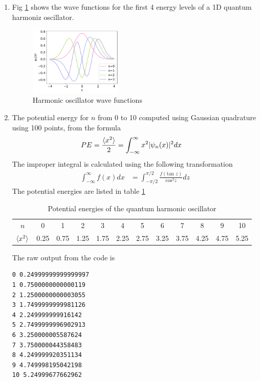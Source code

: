 \documentclass{article}
\begin{document}
\begin{enumerate}
\begin{enumerate}
    \item Fig \ref{fig:3b} shows the wave functions for the first 4 energy levels of a 1D quantum harmoniz oscillator.
    \begin{figure}[H]
        \centering 
        \includegraphics[width=0.42\textwidth]{Q3b.pdf}
        \caption{Harmonic oscillator wave functions}
        \label{fig:3b}
      \end{figure}

    \item The potential energy for $n$ from 0 to 10 computed using Gaussian quadrature using 100 points, from the formula 
    \begin{align*}
        PE &= \frac{\braket{x^2}}{2} = \int_{-\infty}^{\infty}x^2|\psi_n(x)|^2 dx
    \end{align*}
    The improper integral is calculated using the following transformation
    \begin{align*}
        \int_{-\infty}^{\infty} f(x) dx &= \int_{-\pi/2}^{\pi/2} \frac{f(\text{tan }z)}{\text{cos}^2 z} dz
    \end{align*}
    The potential energies are listed in table \ref{tab:3c}
    \begin{table}[h]
        \centering
        \begin{tabular}{c|c c c c c c c c c c c}
            $n$ & 0 & 1 & 2 & 3 & 4 & 5 & 6 & 7 & 8 & 9 & 10 \\
            $\braket{x^2}$ & 0.25 & 0.75 & 1.25 & 1.75 & 2.25 & 2.75 & 3.25 & 3.75 & 4.25 & 4.75 & 5.25
        \end{tabular}
        \caption{Potential energies of the quantum harmonic oscillator}
        \label{tab:3c}
    \end{table}

    The raw output from the code is 
\begin{verbatim}
0 0.24999999999999997
1 0.7500000000000119
2 1.2500000000003055
3 1.7499999999981126
4 2.249999999916142
5 2.7499999996902913
6 3.250000005587624
7 3.750000044358483
8 4.249999920351134
9 4.749998195042198
10 5.24999677662962
\end{verbatim}
\end{enumerate}

\end{enumerate}
\end{document}

